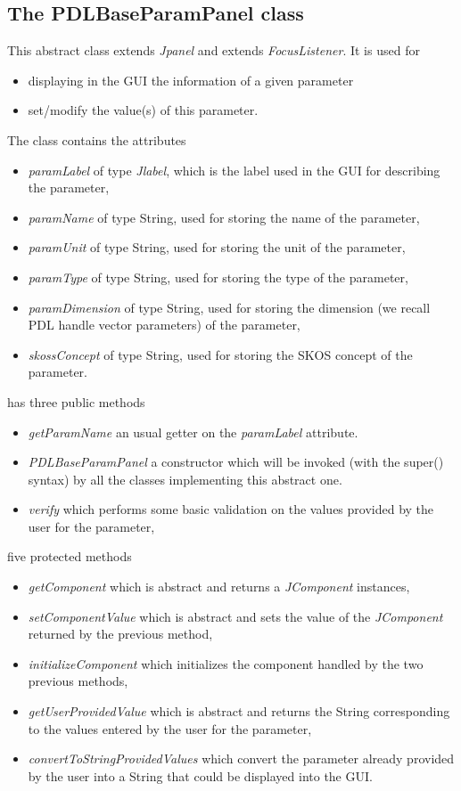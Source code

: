 \documentclass[a4paper,11pt] {ivoa}
\begin{document}
\subsection{The PDLBaseParamPanel class}\label{PDLBaseParamPanel}
This abstract class extends {\it Jpanel} and extends {\it FocusListener}. It is used for 
\begin{itemize}
\item displaying in the GUI the information of a given parameter 
\item set/modify the value(s) of this parameter.\\
\end{itemize}
The class contains the attributes
\begin{itemize}
\item {\it paramLabel} of type {\it Jlabel}, which is the label used in the GUI for describing the parameter,
\item {\it paramName} of type String, used for storing the name of the parameter,
\item {\it paramUnit} of type String, used for storing the unit of the parameter,
\item {\it paramType} of type String, used for storing the type of the parameter,
\item {\it paramDimension} of type String, used for storing the dimension (we recall PDL handle vector parameters) of the parameter,
\item {\it skossConcept} of type String, used for storing the SKOS concept of the parameter.
\end{itemize}
has three public methods
\begin{itemize}
\item {\it getParamName} an usual getter on the {\it paramLabel} attribute.
\item {\it PDLBaseParamPanel} a constructor which will be invoked (with the super() syntax) by all the classes implementing this abstract one. 
\item {\it verify} which performs some basic validation on the values provided by the user for the parameter,
\end{itemize}
five protected methods
\begin{itemize}
\item {\it getComponent} which is abstract and returns a {\it JComponent} instances,
\item {\it setComponentValue} which is abstract and sets the value of the {\it JComponent} returned by the previous method,
\item {\it initializeComponent} which initializes the component handled by the two previous methods,
\item {\it getUserProvidedValue} which is abstract and returns the String corresponding to the values entered by the user for the parameter,
\item {\it convertToStringProvidedValues} which convert the parameter already provided by the user into a String that could be displayed into the GUI.
\end{itemize}
\end{document}
